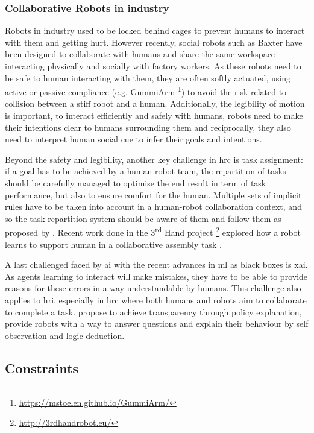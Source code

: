 \subsubsection{Collaborative Robots in industry}
	Robots in industry used to be locked behind cages to prevent humans to interact with them and getting hurt. However recently, social robots such as Baxter \citep{guizzo2012rethink} have been designed to collaborate with humans and share the same workspace interacting physically and socially with factory workers.	As these robots need to be safe to human interacting with them, they are often softly actuated, using active or passive compliance (e.g. GummiArm \footnote{\url{https://mstoelen.github.io/GummiArm/}}) to avoid the risk related to collision between a stiff robot and a human. Additionally, the legibility of motion is important, to interact efficiently and safely with humans, robots need to make their intentions clear to humans surrounding them \citep{dragan2013legibility} and reciprocally, they also need to interpret human social cue to infer their goals and intentions.
	
	Beyond the safety and legibility, another key challenge in \gls{hrc} is task assignment: if a goal has to be achieved by a human-robot team, the repartition of tasks should be carefully managed to  optimise the end result in term of task performance, but also to ensure comfort for the human. Multiple sets of implicit rules have to be taken into account in a human-robot collaboration context, and so the task repartition system should be aware of them and follow them as proposed by \cite{montreuil2007planning}. Recent work done in the 3\textsuperscript{rd} Hand project \footnote{\url{http://3rdhandrobot.eu/}} explored how a robot learns to support human in a collaborative assembly task \citep{munzer2017efficient}.
	
	A last challenged faced by \gls{ai} with the recent advances in \gls{ml} as black boxes is \gls{xai}. As agents learning to interact will make mistakes, they have to be able to provide reasons for these errors in a way understandable by humans. This challenge also applies to \gls{hri}, especially in \gls{hrc} where both humans and robots aim to collaborate to complete a task. \cite{hayes2017improving} propose to achieve transparency through policy explanation, provide robots with a way to answer questions and explain their behaviour by self observation and logic deduction.

\subsection{Constraints} \label{ssec:back_constraints}

